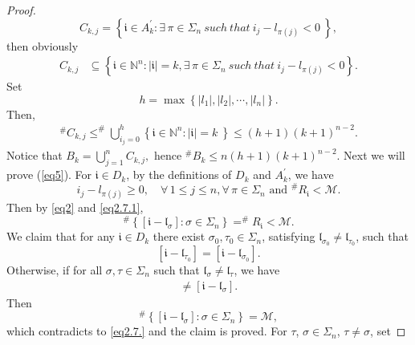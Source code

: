 \documentclass[11pt]{article}
\theoremstyle{plain}
\theoremstyle{definition}
\begin{document}
\begin{proof}
		$$C_{k,j}=\left \{ \mathfrak{i}  \in A_{k}^{\prime}:\exists \, \pi \in \Sigma_{n} \ such \  that \  i_{j}-l_{\pi(j)}<0  \   \right \},$$
then obviously
$$ \begin{aligned}
		C_{k,j} & \subseteq   \left \{  \mathfrak{i}\in\mathbb N^n:    |\mathfrak{i}|=k, \exists \, \pi \in \Sigma_{n} \ such \  that \ i_{j}-l_{\pi(j)}<0  \right \}.
	\end{aligned} $$
Set
	\begin{equation}\label{eq6}
		h=\max \left \{ {\left | l_{1} \right | ,\left | l_{2} \right | ,\cdots ,\left | l_{n} \right |  } \right \}.
	\end{equation}
Then, 
	$$\begin{aligned}^{\#}C_{k,j}
	\leq	^{\#  } \bigcup\limits_{i_{j}=0}^{h} \left \{ \mathfrak{i} \in \mathbb{N}^n: |\mathfrak{i}|=k  \   \right \}  \leq \left ( h+1 \right ) \left ( k+1 \right ) ^{n-2}.
	\end{aligned}$$
 Notice that $B_{k}=\bigcup\limits_{j=1}^{n} C_{k,j},$ hence $^{\#  } B_{k}  \le n\left ( h+1 \right ) \left ( k+1 \right ) ^{n-2}$.
Next we will prove (\ref{eq5}). 
	For $ \mathfrak{i} \in D_{k}$, by the definitions of $D_{k}$ and  $A_{k}^{\prime}$, we have
\begin{equation}\label{eq2.7.1}
 i_{j}-l_{\pi(j)}\ge 0,\quad \forall \, 1\le j\le n ,  \forall \, \pi \in \Sigma_{n} \text{ and }  ^{\#  } R_{\mathfrak{i}  }   <\mathscr{M}. 
 \end{equation}
  Then by \eqref{eq2} and \eqref{eq2.7.1},
\begin{equation}\label{eq2.7.}
^{\#  }\left\{ [\mathfrak{i}-\mathfrak{l}_\sigma]:\sigma \in \Sigma_n \right\}= ^{\#  } R_{\mathfrak{i}  } <\mathscr{M}.
\end{equation}
We claim that for any $\mathfrak{i}\in D_k$ there exist $\sigma_{0}, \tau_{0} \in \Sigma_{n}$,  satisfying $\mathfrak{l}_{\sigma_0}\not=\mathfrak{l}_{\tau_0}$, such that
	\begin{equation}\label{eq2.8.}
		[\mathfrak{i}-\mathfrak{l}_{\tau_0}] = [\mathfrak{i}-\mathfrak{l}_{\sigma_0}].
	\end{equation}
Otherwise, if  for all
$\sigma, \tau \in \Sigma_{n}$ such that $\mathfrak{l}_{\sigma}\not=\mathfrak{l}_{\tau}$, we have
	\begin{eqnarray*}
[\mathfrak{i}-\mathfrak{l}_{\tau}]\not= [\mathfrak{i}-\mathfrak{l}_{\sigma}].
\end{eqnarray*}
Then
$$^{\#  }\left\{ [\mathfrak{i}-\mathfrak{l}_\sigma]:\sigma \in \Sigma_n \right\}= \mathscr{M},
$$
 which contradicts to \eqref{eq2.7.} and the claim is proved.	For $\tau$, $  \sigma \in \Sigma_{n}$, $\tau\not=\sigma$, set

\end{proof}
\end{document}
